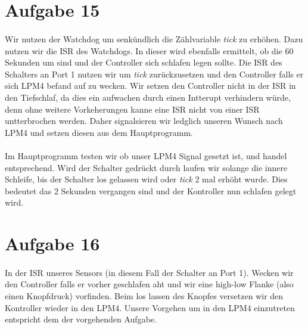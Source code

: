 \section*{Aufgabe 15}

\paragraph*{}
Wir nutzen der Watchdog um senkündlich die Zählvariable {\em tick} zu erhöhen. Dazu nutzen wir die ISR des Watchdogs. In dieser wird ebenfalls ermittelt, ob die 60 Sekunden um sind und der Controller sich schlafen legen sollte. Die ISR des Schalters an Port 1 nutzen wir um {\em tick} zurückzusetzen und den Controller falls er sich LPM4 befand auf zu wecken. Wir setzen den Controller nicht in der ISR in den Tiefschlaf, da dies ein aufwachen durch einen Intterupt verhindern würde, denn ohne weitere Vorkeherungen kanne eine ISR nicht von einer ISR untterbrochen werden. Daher signalsieren wir ledglich unseren Wunsch nach LPM4 und setzen diesen aus dem Hauptprogramm. \\



\paragraph*{}
Im Hauptprogramm testen wir ob unser LPM4 Signal gesetzt ist, und handel entsprechend. Wird der Schalter gedrückt durch laufen wir solange die innere Schleife, bis der Schalter los gelassen wird oder {\em tick} 2 mal erhöht wurde. Dies bedeutet das 2 Sekunden vergangen sind und der Kontroller nun schlafen gelegt wird. \\



\section*{Aufgabe 16}

\paragraph*{}
In der ISR unseres Sensors (in diesem Fall der Schalter an Port 1). Wecken wir den Controller falls er vorher geschlafen aht und wir eine high-low Flanke (also einen Knopfdruck) vorfinden. Beim los lassen des Knopfes versetzen wir den Kontroller wieder in den LPM4. Unsere Vorgehen um in den LPM4 einzutreten entspricht dem der vorgehenden Aufgabe.\\ 


